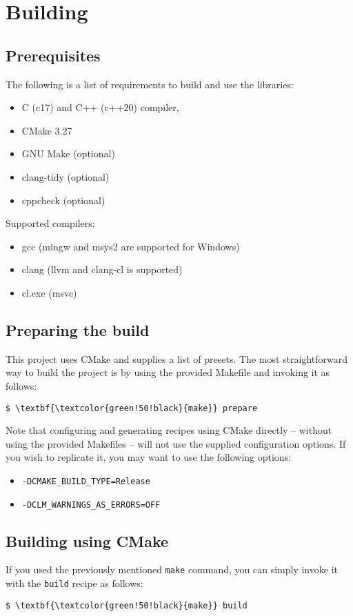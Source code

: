 \section{Building}

\subsection*{Prerequisites}

\noindent The following is a list of requirements to build and use the libraries:
\begin{itemize}
    \item C (c17) and C++ (c++20) compiler,
    \item CMake 3.27
    \item GNU Make (optional)
    \item clang-tidy (optional)
    \item cppcheck (optional)
\end{itemize}
\noindent Supported compilers:
\begin{itemize}
    \item gcc (mingw and msys2 are supported for Windows\texttrademark)
    \item clang (llvm and clang-cl is supported)
    \item cl.exe (msvc)
\end{itemize}

\subsection*{Preparing the build}

This project uses CMake and supplies a list of presets. The most straightforward way to build the project is by using the provided Makefile and invoking it as follows:
\begin{Verbatim}[commandchars=\\\{\}]
    $ \textbf{\textcolor{green!50!black}{make}} prepare
\end{Verbatim}

\noindent Note that configuring and generating recipes using CMake directly -- without using the provided Makefiles -- will not use the supplied configuration options. If you wish to replicate it, you may want to use the following options:
\begin{itemize}
    \item \verb|-DCMAKE_BUILD_TYPE=Release|
    \item \verb|-DCLM_WARNINGS_AS_ERRORS=OFF|
\end{itemize}

\subsection*{Building using CMake}

If you used the previously mentioned \texttt{make} command, you can simply invoke it with the \texttt{build} recipe as follows:
\begin{Verbatim}[commandchars=\\\{\}]
    $ \textbf{\textcolor{green!50!black}{make}} build
\end{Verbatim}
